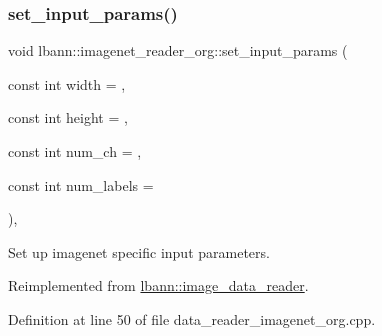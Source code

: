 \subsubsection{\texorpdfstring{set\+\_\+input\+\_\+params()}{set\_input\_params()}}
{\footnotesize\ttfamily void lbann\+::imagenet\+\_\+reader\+\_\+org\+::set\+\_\+input\+\_\+params (\begin{DoxyParamCaption}\item[{const int}]{width = {},  }\item[{const int}]{height = {},  }\item[{const int}]{num\+\_\+ch = {},  }\item[{const int}]{num\+\_\+labels = {} }\end{DoxyParamCaption})\hspace{0.3cm}{\ttfamily [override]}, {\ttfamily [virtual]}}



Set up imagenet specific input parameters. 



Reimplemented from \hyperlink{classlbann_1_1image__data__reader_a6ed9b8b12ad3ffa93ad458d872f8c044}{lbann\+::image\+\_\+data\+\_\+reader}.



Definition at line 50 of file data\+\_\+reader\+\_\+imagenet\+\_\+org.\+cpp.



